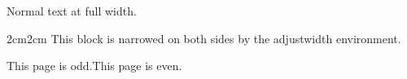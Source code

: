\documentclass{article}
\begin{document}
Normal text at full width.
\begin{adjustwidth}{2cm}{2cm}
This block is narrowed on both sides by the adjustwidth environment.
\end{adjustwidth}
\checkoddpage\ifcpoddpage This page is odd.\else This page is even.\fi
\end{document}
